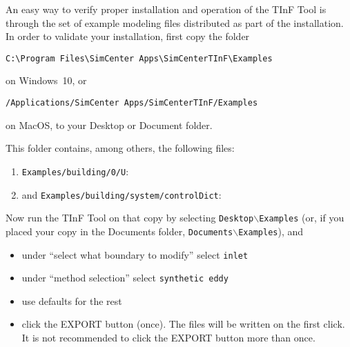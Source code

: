 





An easy way to verify proper installation and operation of the TInF Tool is through the set of example modeling files
distributed as part of the installation.  In order to validate your installation, first copy the folder
\begin{verbatim}
C:\Program Files\SimCenter Apps\SimCenterTInF\Examples
\end{verbatim}
on Windows~10, or
\begin{verbatim}
/Applications/SimCenter Apps/SimCenterTInF/Examples
\end{verbatim}
on MacOS,
to your Desktop or Document folder.
\medskip

\noindent
This folder contains, among others, the following files:
\begin{enumerate}
\item
	\texttt{Examples/building/0/U}:
	
	
\item 
	and \texttt{Examples/building/system/controlDict}:
	
	
\end{enumerate}

\noindent
Now run the TInF Tool on that copy by selecting \texttt{Desktop$\backslash$Examples}
(or, if you placed your copy in the Documents folder, \texttt{Documents$\backslash$Examples}), and 
\begin{itemize}
\item under ``select what boundary to modify'' select \texttt{inlet}
\item under ``method selection'' select \texttt{synthetic eddy}
\item use defaults for the rest
\item click the EXPORT button (once). The files will be written on the first click. It is not recommended to click the EXPORT button more than once.\end{itemize}

